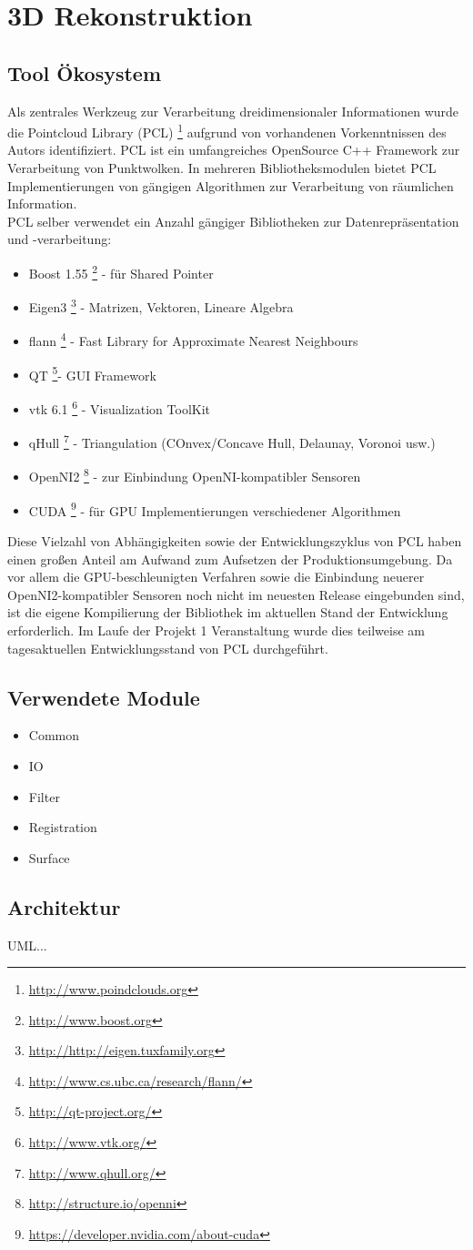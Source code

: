 \section{3D Rekonstruktion}
\subsection{Tool Ökosystem}
Als zentrales Werkzeug zur Verarbeitung dreidimensionaler Informationen wurde die Pointcloud Library (PCL) \footnote{\url{http://www.poindclouds.org}} aufgrund von vorhandenen Vorkenntnissen des Autors identifiziert. PCL ist ein umfangreiches OpenSource C++ Framework zur Verarbeitung von Punktwolken. In mehreren Bibliotheksmodulen bietet PCL Implementierungen von gängigen Algorithmen zur Verarbeitung von räumlichen Information.\\
PCL selber verwendet ein Anzahl gängiger Bibliotheken zur Datenrepräsentation und -verarbeitung:

\begin{itemize}
		\item Boost 1.55 \footnote{\url{http://www.boost.org}} - für Shared Pointer
		\item Eigen3 \footnote{\url{http://http://eigen.tuxfamily.org}} - Matrizen, Vektoren, Lineare Algebra
		\item flann \footnote{\url{http://www.cs.ubc.ca/research/flann/}} - Fast Library for Approximate Nearest Neighbours
		\item QT \footnote{\url{http://qt-project.org/}}- GUI Framework
		\item vtk 6.1 \footnote{\url{http://www.vtk.org/}} - Visualization ToolKit
		\item qHull \footnote{\url{http://www.qhull.org/}} - Triangulation (COnvex/Concave Hull, Delaunay, Voronoi usw.)
		\item OpenNI2 \footnote{\url{http://structure.io/openni}} - zur Einbindung OpenNI-kompatibler Sensoren
		\item CUDA \footnote{\url{https://developer.nvidia.com/about-cuda}} - für GPU Implementierungen verschiedener Algorithmen
\end{itemize}

Diese Vielzahl von Abhängigkeiten sowie der Entwicklungszyklus von PCL haben einen großen Anteil am Aufwand zum Aufsetzen der Produktionsumgebung. Da vor allem die GPU-beschleunigten Verfahren sowie die Einbindung neuerer OpenNI2-kompatibler Sensoren noch nicht im neuesten Release eingebunden sind, ist die eigene Kompilierung der Bibliothek im aktuellen Stand der Entwicklung erforderlich. Im Laufe der Projekt 1 Veranstaltung wurde dies teilweise am tagesaktuellen Entwicklungsstand von PCL durchgeführt.\\

\subsection{Verwendete Module}
\begin{itemize}
	\item Common
	\item IO
	\item Filter
	\item Registration
	\item Surface
\end{itemize}

\subsection{Architektur}
UML...
